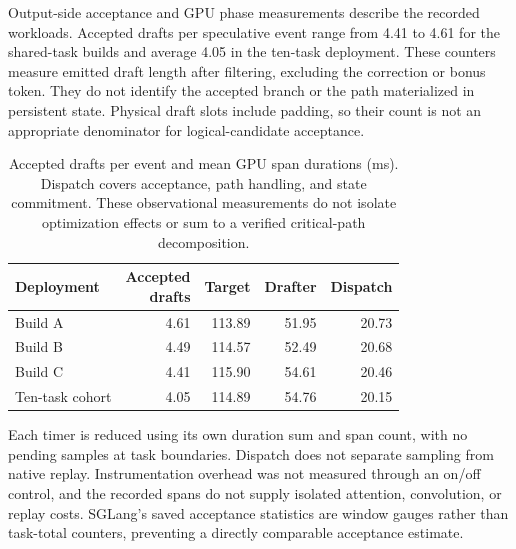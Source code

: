 Output-side acceptance and GPU phase measurements describe the recorded workloads. Accepted drafts per speculative event range from 4.41 to 4.61 for the shared-task builds and average 4.05 in the ten-task deployment. These counters measure emitted draft length after filtering, excluding the correction or bonus token. They do not identify the accepted branch or the path materialized in persistent state. Physical draft slots include padding, so their count is not an appropriate denominator for logical-candidate acceptance.

\begin{table}[t]
\caption{Accepted drafts per event and mean GPU span durations (ms). Dispatch covers acceptance, path handling, and state commitment. These observational measurements do not isolate optimization effects or sum to a verified critical-path decomposition.}
\label{tab:recovered-telemetry}
\centering\small
\begin{tabular}{@{}lrrrr@{}}
\toprule
Deployment & \shortstack{Accepted\\drafts} & Target & Drafter & Dispatch \\
\midrule
Build A & 4.61 & 113.89 & 51.95 & 20.73 \\
Build B & 4.49 & 114.57 & 52.49 & 20.68 \\
Build C & 4.41 & 115.90 & 54.61 & 20.46 \\
Ten-task cohort & 4.05 & 114.89 & 54.76 & 20.15 \\
\bottomrule
\end{tabular}
\end{table}

Each timer is reduced using its own duration sum and span count, with no pending samples at task boundaries. Dispatch does not separate sampling from native replay. Instrumentation overhead was not measured through an on/off control, and the recorded spans do not supply isolated attention, convolution, or replay costs. SGLang's saved acceptance statistics are window gauges rather than task-total counters, preventing a directly comparable acceptance estimate.
